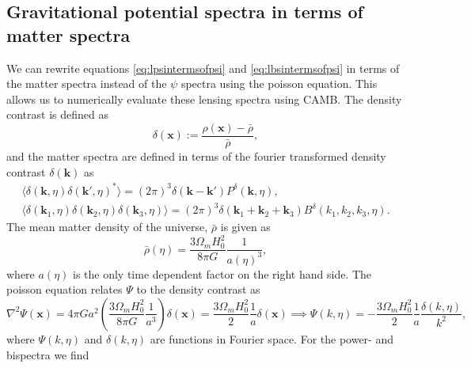 \documentclass[11pt]{article} %
\newcommand{\br}[1]{\ensuremath{\left( #1 \right)}}
\begin{document}
\subsection{Gravitational potential spectra in terms of matter spectra}
We can rewrite equations \ref{eq:lpsintermsofpsi} and \ref{eq:lbsintermsofpsi} in terms of the matter spectra instead of the $\psi$ spectra using the poisson equation. This allows us to numerically evaluate these lensing spectra using CAMB. The density contrast is defined as
\begin{equation}
    \delta(\mathbf x) := \frac{\rho(\mathbf x)-\bar \rho}{\bar\rho},
\end{equation}
and the matter spectra are defined in terms of the fourier transformed density contrast $\delta(\mathbf k)$ as 
\begin{gather*}
    \langle \delta(\mathbf k, \eta) \delta(\mathbf k', \eta)^* \rangle = (2\pi)^3\delta(\mathbf k - \mathbf k')P^\delta(\mathbf k, \eta),\\
    \langle \delta(\mathbf k_1, \eta) \delta(\mathbf k_2, \eta) \delta(\mathbf k_3, \eta) \rangle = (2\pi)^3\delta(\mathbf k_1 + \mathbf k_2 + \mathbf k_3)B^\delta(k_1, k_2, k_3, \eta).
\end{gather*}
The mean matter density of the universe, \( \bar{\rho} \) is given as 
$$
\bar{\rho}(\eta) = \frac{3 \Omega_m H_0^2}{8 \pi G}\frac{1}{a(\eta)^3},
$$
where $a(\eta)$ is the only time dependent factor on the right hand side.
The poisson equation relates $\Psi$ to the density contrast as \cite{dodelson2020modern}
\begin{equation}
    \nabla^2\Psi(\mathbf x) = 4\pi G a^2\br{\frac{3\Omega_m H_0^2}{8\pi G}\frac{1}{a^3}}\delta(\mathbf x) = \frac{3\Omega_m H_0^2}{2} \frac{1}{a}\delta(\mathbf x) \implies \Psi(k, \eta) = -\frac{3\Omega_m H_0^2}{2}\frac{1}{a}\frac{\delta(k, \eta)}{k^2},
\end{equation}
where $\Psi(k,\eta)$ and $\delta(k,\eta)$ are functions in Fourier space. For the power- and bispectra we find
\end{document}
